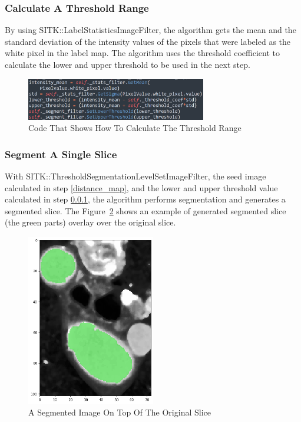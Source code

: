 \subsubsection{Calculate A Threshold Range} \label{threshold}
By using SITK::LabelStatisticsImageFilter, the algorithm gets the mean and the standard deviation of the intensity values of the pixels that were labeled as the white pixel in the label map. The algorithm uses the threshold coefficient to calculate the lower and upper threshold to be used in the next step.

\begin{figure}[H]
    \centering
    \includegraphics[width=0.7\textwidth]{figures/AGR/threshold.png}
    \caption[Code That Shows How To Calculate The Threshold Range]{Code That Shows How To Calculate The Threshold Range}
    \label{fig_threshold}
\end{figure}

\subsubsection{Segment A Single Slice}\label{c}
With SITK::ThresholdSegmentationLevelSetImageFilter, the seed image calculated in step \ref{distance_map}, and the lower and upper threshold value calculated in step \ref{threshold}, the algorithm performs segmentation and generates a segmented slice. The Figure~\ref{fig_segmented_image} shows an example of generated segmented slice (the green parts) overlay over the original slice.

\begin{figure}[H]
    \centering
    \includegraphics[width=0.5\textwidth]{figures/AGR/segment_label_image.png}
    \caption[A Segmented Image]{A Segmented Image On Top Of The Original Slice}
    \label{fig_segmented_image}
\end{figure}

